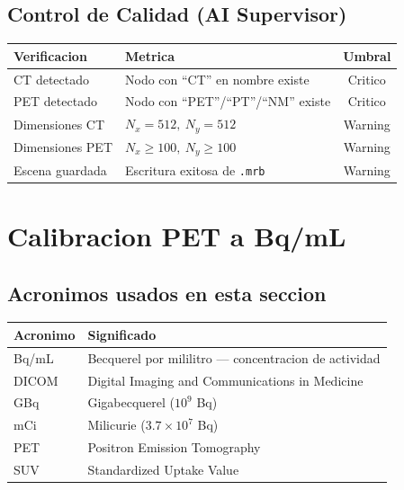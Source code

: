 \documentclass[12pt,a4paper]{article}
\begin{document}
\subsection{Control de Calidad (AI Supervisor)}

\begin{table}[H]
\centering
\begin{tabular}{llc}
\toprule
\textbf{Verificacion} & \textbf{Metrica} & \textbf{Umbral} \\
\midrule
CT detectado & Nodo con ``CT'' en nombre existe & Critico \\
PET detectado & Nodo con ``PET''/``PT''/``NM'' existe & Critico \\
Dimensiones CT & $N_x = 512,\ N_y = 512$ & Warning \\
Dimensiones PET & $N_x \geq 100,\ N_y \geq 100$ & Warning \\
Escena guardada & Escritura exitosa de \texttt{.mrb} & Warning \\
\bottomrule
\end{tabular}
\end{table}

\newpage

\section{Calibracion PET a Bq/mL}
\label{sec:calibracion}

\subsection*{Acronimos usados en esta seccion}
\begin{tabular}{ll}
\toprule
\textbf{Acronimo} & \textbf{Significado} \\
\midrule
Bq/mL & Becquerel por mililitro --- concentracion de actividad \\
DICOM & Digital Imaging and Communications in Medicine \\
GBq & Gigabecquerel ($10^9$ Bq) \\
mCi & Milicurie ($3.7 \times 10^7$ Bq) \\
PET & Positron Emission Tomography \\
SUV & Standardized Uptake Value \\
\bottomrule
\end{tabular}
\end{document}

